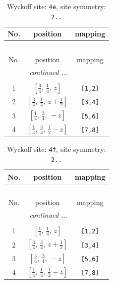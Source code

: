 \documentclass[fleqn,8pt]{jsarticle}
\begin{document}
\renewcommand{\arraystretch}{1.2}
\begin{longtable}{ccc}
\caption{Wyckoff site: {\tt 4e}, site symmetry: {\tt 2..}}
 \\
 \hline \hline
No. & position & mapping \\ \hline \endfirsthead

\multicolumn{2}{l}{\tablename\ \thetable{}} \\
 \hline \hline
No. & position & mapping \\ \hline \endhead

 \hline \hline
\multicolumn{2}{r}{\footnotesize\it continued ...} \\ \endfoot

 \hline \hline
\multicolumn{2}{r}{} \\ \endlastfoot

1 & $\left[ \frac{3}{4},\, \frac{1}{4},\, z \right]$ & {\tt [1,2]} \\ \hline
2 & $\left[ \frac{3}{4},\, \frac{1}{4},\, z + \frac{1}{2} \right]$ & {\tt [3,4]} \\ \hline
3 & $\left[ \frac{1}{4},\, \frac{3}{4},\, - z \right]$ & {\tt [5,6]} \\ \hline
4 & $\left[ \frac{1}{4},\, \frac{3}{4},\, \frac{1}{2} - z \right]$ & {\tt [7,8]} \\
\end{longtable}
\renewcommand{\arraystretch}{1.2}
\begin{longtable}{ccc}
\caption{Wyckoff site: {\tt 4f}, site symmetry: {\tt 2..}}
 \\
 \hline \hline
No. & position & mapping \\ \hline \endfirsthead

\multicolumn{2}{l}{\tablename\ \thetable{}} \\
 \hline \hline
No. & position & mapping \\ \hline \endhead

 \hline \hline
\multicolumn{2}{r}{\footnotesize\it continued ...} \\ \endfoot

 \hline \hline
\multicolumn{2}{r}{} \\ \endlastfoot

1 & $\left[ \frac{1}{4},\, \frac{1}{4},\, z \right]$ & {\tt [1,2]} \\ \hline
2 & $\left[ \frac{3}{4},\, \frac{3}{4},\, z + \frac{1}{2} \right]$ & {\tt [3,4]} \\ \hline
3 & $\left[ \frac{3}{4},\, \frac{3}{4},\, - z \right]$ & {\tt [5,6]} \\ \hline
4 & $\left[ \frac{1}{4},\, \frac{1}{4},\, \frac{1}{2} - z \right]$ & {\tt [7,8]} \\
\end{longtable}
\end{document}
